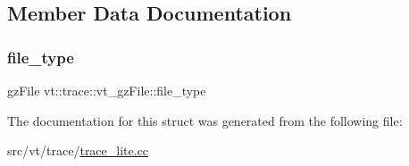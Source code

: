 \subsection{Member Data Documentation}
\mbox{\label{structvt_1_1trace_1_1vt__gz_file_ad76fc8569dffe67628ad492daee76dbf}} 
\subsubsection{\texorpdfstring{file\+\_\+type}{file\_type}}
{\footnotesize\ttfamily gz\+File vt\+::trace\+::vt\+\_\+gz\+File\+::file\+\_\+type}



The documentation for this struct was generated from the following file\+:\begin{DoxyCompactItemize}
\item 
src/vt/trace/\hyperlink{trace__lite_8cc}{trace\+\_\+lite.\+cc}\end{DoxyCompactItemize}
